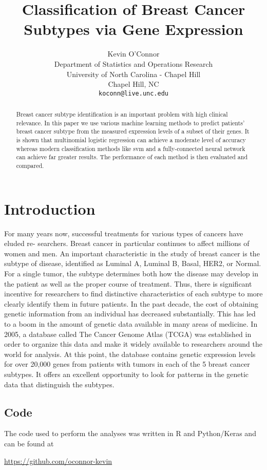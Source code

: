 \documentclass{article}
\title{Classification of Breast Cancer Subtypes via Gene Expression}
\author{
  Kevin O'Connor  \\
  Department of Statistics and Operations Research\\
  University of North Carolina - Chapel Hill\\
  Chapel Hill, NC \\
  \texttt{koconn@live.unc.edu} \\
}
\begin{document}

\maketitle

\begin{abstract}
Breast cancer subtype identification is an important problem with high clinical relevance. In this paper we use various machine learning methods to predict patients' breast cancer subtype from the measured expression levels of a subset of their genes. It is shown that multinomial logistic regression can achieve a moderate level of accuracy whereas modern classification methods like svm and a fully-connected neural network can achieve far greater results. The performance of each method is then evaluated and compared.
\end{abstract}

\section{Introduction}
For many years now, successful treatments for various types of cancers have eluded re- searchers. Breast cancer in particular continues to affect millions of women and men. An important characteristic in the study of breast cancer is the subtype of disease, identified as Luminal A, Luminal B, Basal, HER2, or Normal. For a single tumor, the subtype determines both how the disease may develop in the patient as well as the proper course of treatment. Thus, there is significant incentive for researchers to find distinctive characteristics of each subtype to more clearly identify them in future patients.
\newline\newline In the past decade, the cost of obtaining genetic information from an individual has decreased substantially. This has led to a boom in the amount of genetic data available in many areas of medicine. In 2005, a database called The Cancer Genome Atlas (TCGA) was established in order to organize this data and make it widely available to researchers around the world for analysis. At this point, the database contains genetic expression levels for over 20,000 genes from patients with tumors in each of the 5 breast cancer subtypes. It offers an excellent opportunity to look for patterns in the genetic data that distinguish the subtypes.

\subsection{Code}
The code used to perform the analyses was written in R and Python/Keras and can be found at 
\begin{center}
\url{https://github.com/oconnor-kevin}
\end{center}
\end{document}
